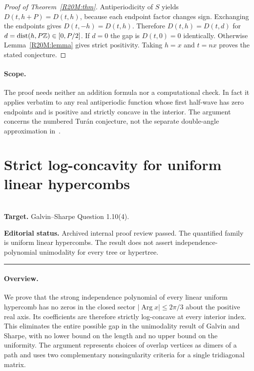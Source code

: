 \documentclass[11pt,a4paper]{article}
\begin{document}
\begin{proof}[Proof of Theorem~\ref{R20M:thm}]
Antiperiodicity of $S$ yields $D(t,h+P)=D(t,h)$, because each
endpoint factor changes sign. Exchanging the endpoints gives
$D(t,-h)=D(t,h)$. Therefore $D(t,h)=D(t,d)$ for
$d=\operatorname{dist}(h,P\mathbb Z)\in[0,P/2]$. If $d=0$ the gap is
$D(t,0)=0$ identically. Otherwise Lemma~\ref{R20M:lemma} gives strict
positivity. Taking $h=x$ and $t=nx$ proves the stated conjecture.
\end{proof}

\paragraph{Scope.}
The proof needs neither an addition formula nor a computational check.
In fact it applies verbatim to any real antiperiodic function whose
first half-wave has zero endpoints and is positive and strictly concave
in the interior. The argument concerns the numbered Tur\'an conjecture,
not the separate double-angle approximation in~\cite[Section~6]{R20M:jekl}.
\endgroup


\clearpage

\section{Strict log-concavity for uniform linear hypercombs}
\label{section:R21T}
\\[3pt]
\noindent\textbf{Target.} Galvin--Sharpe Question 1.10(4).

\noindent\textbf{Editorial status.} Archived internal proof review passed. The quantified family is uniform linear hypercombs. The result does not assert independence-polynomial unimodality for every tree or hypertree.

\smallskip\hrule\medskip



\begingroup
\newcommand{\ii}{\mathrm i}
\newcommand{\Arg}{\operatorname{Arg}}
\setcounter{equation}{0}
\renewcommand{\theequation}{\thesection.\arabic{equation}}
\renewcommand{\theHequation}{R21T.\arabic{equation}}
\paragraph{Overview.}
We prove that the strong independence polynomial of every linear uniform
hypercomb has no zeros in the closed sector $|\Arg x|\le 2\pi/3$ about
the positive real axis. Its coefficients are therefore strictly log-concave
at every interior index. This eliminates the entire possible gap in the
unimodality result of Galvin and Sharpe, with no lower bound on the length
and no upper bound on the uniformity. The argument represents choices of
overlap vertices as dimers of a path and uses two complementary nonsingularity
criteria for a single tridiagonal matrix.
\end{document}
